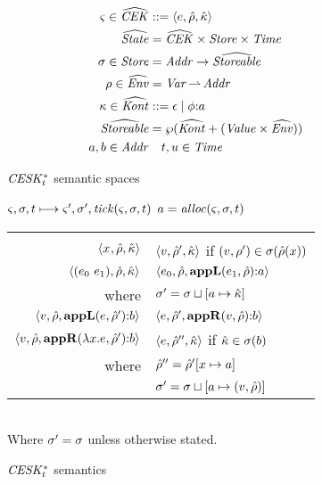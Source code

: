\begin{figure}
  \centering
  \begin{align*}
    \varsigma \in \widehat{\mathit{CEK}} &::= \langle e, \hat{\rho}, \hat{\kappa} \rangle \\
    \widehat{\mathit{State}} &= \widehat{\mathit{CEK}} \times \mathit{Store} \times \mathit{Time} \\
    \sigma \in \mathit{Store} &= \mathit{Addr} \to \widehat{\mathit{Storeable}} \\
    \rho \in \widehat{\mathit{Env}} &= \mathit{Var} \operatorname*{\rightharpoonup} \mathit{Addr} \\
    \kappa \in \widehat{\mathit{Kont}} &::= \epsilon \mathrel{\mid} \phi{\tt :} a \\
    \widehat{\mathit{Storeable}} &= \wp(\widehat{\mathit{Kont}} + (\mathit{Value} \times \widehat{\mathit{Env}})) \\
    a,b \in \mathit{Addr} & \quad t,u \in \mathit{Time}
  \end{align*}
  \caption{$\mathit{CESK^*_t}$ semantic spaces}
  \label{fig:ceskstart-spaces}
\end{figure}

\begin{figure}
  \centering
  $\varsigma,\sigma,t \longmapsto \varsigma',\sigma',\mathit{tick}(\varsigma,\sigma,t)$ \quad $a = \mathit{alloc}(\varsigma,\sigma,t)$ \\
  \begin{tabular}{r|l}
    \hline\vspace{-3mm}\\
    $\langle x^{{}}, \hat{\rho}, \hat{\kappa} \rangle$
    &
    $\langle v, \hat{\rho}',\hat{\kappa} \rangle$ if $(v,\rho') \in \sigma(\hat{\rho}(x))$
    \\
    $\langle (e_{0}\ e_{1}){},\hat{\rho},\hat{\kappa} \rangle$
    &
    $\langle e_{0},\hat{\rho},\mathbf{appL}(e_{1},\hat{\rho}){\tt :} a \rangle$ \\
    where & $\sigma' = \sigma\sqcup[a \mapsto \hat{\kappa}]$
    \\
    $\langle v,\hat{\rho}, \mathbf{appL}(e,\hat{\rho}'){\tt :} b \rangle$
    &
    $\langle e,\hat{\rho}',\mathbf{appR}(v,\hat{\rho}){\tt :} b \rangle$
    \\
    $\langle v,\hat{\rho},\mathbf{appR}(\lambda{} x. e,\hat{\rho}'){\tt :} b \rangle$
    &
    $\langle e,\hat{\rho}'',\hat{\kappa} \rangle$ if $\hat{\kappa} \in \sigma(b)$ \\
    where & $\hat{\rho}'' = \hat{\rho}'[x\mapsto a]$ \\
          & $\sigma' = \sigma\sqcup[a \mapsto (v,\hat{\rho})]$
  \end{tabular} \\
  Where $\sigma' = \sigma$ unless otherwise stated.
  \caption{$\mathit{CESK^*_t}$ semantics}
  \label{fig:ceskstart-semantics}
\end{figure}

